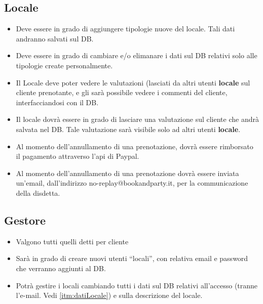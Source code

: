 \subsection{Locale}
\begin{itemize}
    \item Deve essere in grado di aggiungere tipologie nuove del locale. Tali dati andranno 
    salvati sul DB.
    \item Deve essere in grado di cambiare e/o elimanare i dati sul DB relativi solo alle 
    tipologie create personalmente.
    \item Il Locale deve poter vedere le valutazioni (lasciati da altri utenti \textbf{locale} 
    sul cliente prenotante, e gli sarà possibile vedere i commenti del cliente, interfacciandosi 
    con il DB.
    \item Il locale dovrà essere in grado di lasciare una valutazione sul cliente che andrà 
    salvata nel DB. Tale valutazione sarà visibile solo ad altri utenti \textbf{locale}.
    \item Al momento dell'annullamento di una prenotazione, dovrà essere rimborsato il pagamento 
    attraverso l’api di Paypal.
    \item Al momento dell'annullamento di una prenotazione dovrà essere inviata un'email,
    dall'indirizzo no-replay@bookandparty.it, per la communicazione della disdetta.
\end{itemize}

\subsection{Gestore}
\begin{itemize}    
    \item Valgono tutti quelli detti per cliente
    \item Sarà in grado di creare nuovi utenti “locali”, con relativa email e password che 
    verranno aggiunti al DB.
    \item Potrà gestire i locali cambiando tutti i dati sul DB relativi all'accesso (tranne 
    l’e-mail. Vedi \ref{itm:datiLocale}) e sulla descrizione del locale.
\end{itemize}
